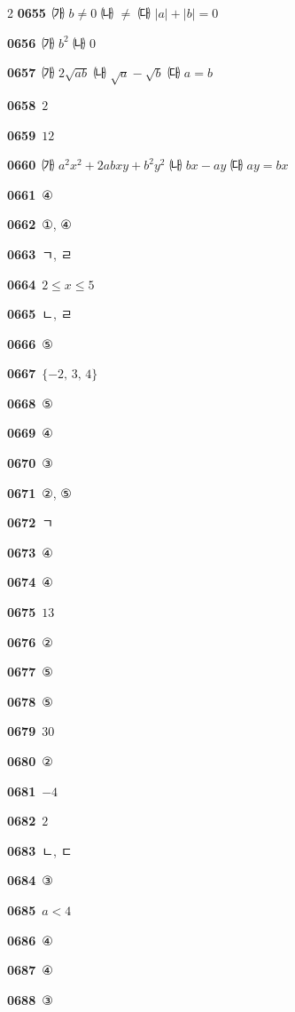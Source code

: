 \documentclass[10pt,a4paper]{article}
\begin{document}
\begin{multicols}{2}
\noindent\textbf{0655}\ ㈎ $b\ne 0$ \quad ㈏ $\ne$ \quad ㈐ $|a|+|b|=0$\par
\noindent\textbf{0656}\ ㈎ $b^2$ \quad ㈏ $0$\par
\noindent\textbf{0657}\ ㈎ $2\sqrt{ab}$ \quad ㈏ $\sqrt{a}-\sqrt{b}$ \quad ㈐ $a=b$\par
\noindent\textbf{0658}\ $2$\par
\noindent\textbf{0659}\ $12$\par
\noindent\textbf{0660}\ ㈎ $a^2x^2+2abxy+b^2y^2$ \quad ㈏ $bx-ay$ \quad ㈐ $ay=bx$\par
\noindent\textbf{0661}\ ④\par
\noindent\textbf{0662}\ ①, ④\par
\noindent\textbf{0663}\ ㄱ, ㄹ\par
\noindent\textbf{0664}\ $2\le x\le 5$\par
\noindent\textbf{0665}\ ㄴ, ㄹ\par
\noindent\textbf{0666}\ ⑤\par
\noindent\textbf{0667}\ $\{-2,\,3,\,4\}$\par
\noindent\textbf{0668}\ ⑤\par
\noindent\textbf{0669}\ ④\par
\noindent\textbf{0670}\ ③\par
\noindent\textbf{0671}\ ②, ⑤\par
\noindent\textbf{0672}\ ㄱ\par
\noindent\textbf{0673}\ ④\par
\noindent\textbf{0674}\ ④\par
\noindent\textbf{0675}\ $13$\par
\noindent\textbf{0676}\ ②\par
\noindent\textbf{0677}\ ⑤\par
\noindent\textbf{0678}\ ⑤\par
\noindent\textbf{0679}\ $30$\par
\noindent\textbf{0680}\ ②\par
\noindent\textbf{0681}\ $-4$\par
\noindent\textbf{0682}\ $2$\par
\noindent\textbf{0683}\ ㄴ, ㄷ\par
\noindent\textbf{0684}\ ③\par
\noindent\textbf{0685}\ $a<4$\par
\noindent\textbf{0686}\ ④\par
\noindent\textbf{0687}\ ④\par
\noindent\textbf{0688}\ ③\par

\end{multicols}
\end{document}
